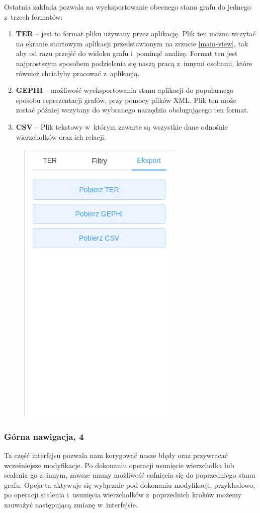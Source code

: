\documentclass[12pt, a4paper]{article}
\begin{document}
Ostatnia zakłada pozwala na wyeksportowanie obecnego stanu grafu do jednego z~trzech formatów:

\begin{enumerate}
  \item \textbf{TER} -- jest to format pliku używany przez aplikację. Plik ten można wczytać na ekranie startowym aplikacji przedstawionym na zrzucie \ref{main-view}, tak aby od razu przejść do widoku grafu i~pominąć analizę. Format ten jest najprostszym sposobem podzielenia się naszą pracą z~innymi osobami, które również chciałyby pracować z~aplikacją.
  \item \textbf{GEPHI} -- możliwość wyeksportowania stanu aplikacji do popularnego sposobu reprezentacji grafów, przy pomocy plików XML. Plik ten może zostać później wczytany do wybranego narzędzia obsługującego ten format.
  \item \textbf{CSV} -- Plik tekstowy w~którym zawarte są wszystkie dane odnośnie wierzchołków oraz ich relacji.
\end{enumerate}

\begin{figure}[H]
  \centering
  \includegraphics[width=0.4\linewidth, trim={0 8cm 0 0},clip]{images/graph-export.png}
\end{figure}

\subsubsection{Górna nawigacja, 4}

Ta część interfejsu pozwala nam korygować nasze błędy oraz przywracać wcześniejsze modyfikacje. Po dokonaniu operacji usunięcie wierzchołka lub scalenia go z~innym, zawsze mamy możliwość cofnięcia się do poprzedniego stanu grafu. Opcja ta aktywuje się wyłącznie pod dokonaniu modyfikacji, przykładowo, po operacji scalenia i~usunięcia wierzchołków z~poprzednich kroków możemy zauważyć następującą zmianę w~interfejsie.
\end{document}
